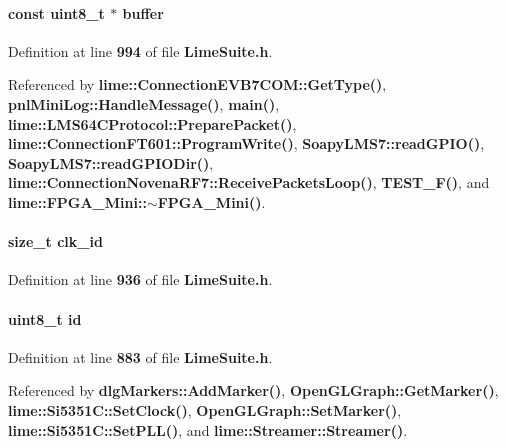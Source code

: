 \paragraph[{buffer}]{\setlength{\rightskip}{0pt plus 5cm}const uint8\+\_\+t $\ast$ buffer}\label{group__FN__LOW__LVL_ga9e71a98856288ad285d7472959bc387e}


Definition at line {\bf 994} of file {\bf Lime\+Suite.\+h}.



Referenced by {\bf lime\+::\+Connection\+E\+V\+B7\+C\+O\+M\+::\+Get\+Type()}, {\bf pnl\+Mini\+Log\+::\+Handle\+Message()}, {\bf main()}, {\bf lime\+::\+L\+M\+S64\+C\+Protocol\+::\+Prepare\+Packet()}, {\bf lime\+::\+Connection\+F\+T601\+::\+Program\+Write()}, {\bf Soapy\+L\+M\+S7\+::read\+G\+P\+I\+O()}, {\bf Soapy\+L\+M\+S7\+::read\+G\+P\+I\+O\+Dir()}, {\bf lime\+::\+Connection\+Novena\+R\+F7\+::\+Receive\+Packets\+Loop()}, {\bf T\+E\+S\+T\+\_\+\+F()}, and {\bf lime\+::\+F\+P\+G\+A\+\_\+\+Mini\+::$\sim$\+F\+P\+G\+A\+\_\+\+Mini()}.

\paragraph[{clk\+\_\+id}]{\setlength{\rightskip}{0pt plus 5cm}size\+\_\+t clk\+\_\+id}\label{group__FN__LOW__LVL_ga41e94e558bfa441466772aae351e05c4}


Definition at line {\bf 936} of file {\bf Lime\+Suite.\+h}.

\paragraph[{id}]{\setlength{\rightskip}{0pt plus 5cm}uint8\+\_\+t id}\label{group__FN__LOW__LVL_ga1e6927fa1486224044e568f9c370519b}


Definition at line {\bf 883} of file {\bf Lime\+Suite.\+h}.



Referenced by {\bf dlg\+Markers\+::\+Add\+Marker()}, {\bf Open\+G\+L\+Graph\+::\+Get\+Marker()}, {\bf lime\+::\+Si5351\+C\+::\+Set\+Clock()}, {\bf Open\+G\+L\+Graph\+::\+Set\+Marker()}, {\bf lime\+::\+Si5351\+C\+::\+Set\+P\+L\+L()}, and {\bf lime\+::\+Streamer\+::\+Streamer()}.

